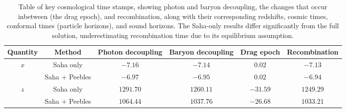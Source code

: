 \documentclass{aa}
\numberwithin{equation}{section}
\numberwithin{table}{section}
\numberwithin{figure}{section}
\begin{document}
\begin{table*}
  \caption{Table of key cosmological time stamps, showing photon and baryon decoupling, the changes that occur inbetween (the drag epoch), and recombination, along with their corresponding redshifts, cosmic times, conformal times (particle horizons), and sound horizons. The Saha-only results differ significantly from the full solution, underestimating recombination time due to its equilibrium assumption.} 
  \label{table:time stamps decoupling}    %
  \centering                          %
  \begin{tabular}{| c || c || c | c | c | c |}        %
  \hline                %
  Quantity & Method & Photon decoupling & Baryon decoupling & Drag epoch & Recombination \\    %
  \hline\hline                        %
  \multirow{2}{*}{$x$}       & Saha only       & \hspace{4.5pt}$-7.16$  & \hspace{4.5pt}$-7.14$     & \hspace{4.5pt}$0.02$        & \hspace{4.5pt}$-7.13$   \\      
  \cline{2-6}
                           & Saha + Peebles  & \hspace{4.5pt}$-6.97$  & \hspace{4.5pt}$-6.95$     & \hspace{4.5pt}$0.02$        & \hspace{4.5pt}$-6.94$   \\      
  \hline 
  \multirow{2}{*}{$z$}       & Saha only       & \hspace{-4pt}$1291.70$ & \hspace{-4pt}$1260.11$    & \hspace{-7pt}$-31.59$       & \hspace{-4pt}$1249.29$ \\
  \cline{2-6}
                           & Saha + Peebles  & \hspace{-4pt}$1064.44$ & \hspace{-4pt}$1037.76$    & \hspace{-7pt}$-26.68$       & \hspace{-4pt}$1033.21$ \\

\end{tabular}
\end{table*}
\end{document}
